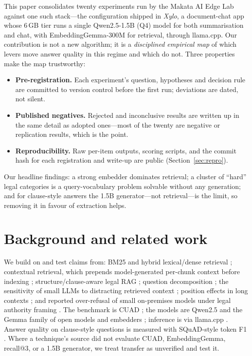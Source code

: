 \documentclass[11pt]{article}
\begin{document}
This paper consolidates twenty experiments run by the Makata AI Edge Lab against one such
stack---the configuration shipped in \emph{Xylo}, a document-chat app whose 6\,GB tier runs a
single Qwen2.5-1.5B (Q4) model for both summarisation and chat, with EmbeddingGemma-300M for
retrieval, through llama.cpp. Our contribution is not a new algorithm; it is a
\emph{disciplined empirical map} of which levers move answer quality in this regime and which
do not. Three properties make the map trustworthy:

\begin{itemize}
  \item \textbf{Pre-registration.} Each experiment's question, hypotheses and decision rule
  are committed to version control before the first run; deviations are dated, not silent.
  \item \textbf{Published negatives.} Rejected and inconclusive results are written up in the
  same detail as adopted ones---most of the twenty are negative or replication results, which
  is the point.
  \item \textbf{Reproducibility.} Raw per-item outputs, scoring scripts, and the commit hash
  for each registration and write-up are public (Section~\ref{sec:repro}).
\end{itemize}

Our headline findings: a strong embedder dominates retrieval; a cluster of ``hard'' legal
categories is a query-vocabulary problem solvable without any generation; and for clause-style
answers the 1.5B generator---not retrieval---is the limit, so removing it in favour of
extraction helps.

\section{Background and related work}
We build on and test claims from: BM25 and hybrid lexical/dense retrieval
\citep{robertson2009bm25}; contextual retrieval, which prepends model-generated per-chunk
context before indexing \citep{anthropic2024contextual}; structure/clause-aware legal RAG
\citep{strucchunk}; question decomposition \citep{resin}; the sensitivity of small LLMs to
distracting retrieved context \citep{cuconasu2024noise,longctx2025rag}; position effects in
long contexts \citep{liu2023lost}; and reported over-refusal of small on-premises models under
legal authority framing \citep{overrefusal2026}. The benchmark is CUAD \citep{hendrycks2021cuad};
the models are Qwen2.5 \citep{qwen2025} and the Gemma family of open models and embedders
\citep{gemma,embeddinggemma}; inference is via llama.cpp \citep{llamacpp}. Answer quality on
clause-style questions is measured with SQuAD-style token F1 \citep{rajpurkar2016squad}.
Where a technique's source did not evaluate CUAD, EmbeddingGemma, recall@3, or a 1.5B generator,
we treat transfer as unverified and test it.
\end{document}
